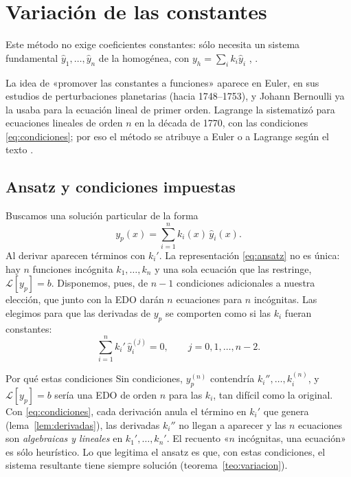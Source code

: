 \documentclass[11pt,twoside]{article}
\newcommand\Lop{\mathcal L}
\newcommand\yh{\hat y}
\begin{document}
\section{Variación de las constantes}\label{sec:variacion}

Este método no exige coeficientes constantes: sólo necesita un sistema fundamental $\yh_1,\dots,\yh_n$ de la homogénea, con
$y_h=\sum_ik_i\yh_i$ \cite[cap.~15]{riley}, \cite[cap.~IV]{usal}.

\begin{observacion}\label{obs:historia}
La idea de «promover las constantes a funciones» aparece en Euler, en sus estudios de perturbaciones planetarias (hacia
1748--1753), y Johann Bernoulli ya la usaba para la ecuación lineal de primer orden. Lagrange la sistematizó para
ecuaciones lineales de orden $n$ en la década de 1770, con las condiciones \eqref{eq:condiciones}; por eso el método se
atribuye a Euler o a Lagrange según el texto \cite{kline}.
\end{observacion}

\subsection{Ansatz y condiciones impuestas}\label{sec:ansatz}

Buscamos una solución particular de la forma
\begin{equation}\label{eq:ansatz}
y_p(x)=\sum_{i=1}^{n}k_i(x)\,\yh_i(x).
\end{equation}
Al derivar aparecen términos con $k_i'$. La representación \eqref{eq:ansatz} no es única: hay $n$ funciones incógnita
$k_1,\dots,k_n$ y una sola ecuación que las restringe, $\Lop[y_p]=b$. Disponemos, pues, de $n-1$ condiciones adicionales a
nuestra elección, que junto con la EDO darán $n$ ecuaciones para $n$ incógnitas. Las elegimos para que las derivadas de
$y_p$ se comporten como si las $k_i$ fueran constantes:
\begin{equation}\label{eq:condiciones}
\sum_{i=1}^{n}k_i'\,\yh_i^{(j)}=0,\qquad j=0,1,\dots,n-2.
\end{equation}

\begin{motivacion}{Por qué estas condiciones}
Sin condiciones, $y_p^{(n)}$ contendría $k_i'',\dots,k_i^{(n)}$, y $\Lop[y_p]=b$ sería una EDO de orden $n$ para las $k_i$,
tan difícil como la original. Con \eqref{eq:condiciones}, cada derivación anula el término en $k_i'$ que genera
(lema~\ref{lem:derivadas}), las derivadas $k_i''$ no llegan a aparecer y las $n$ ecuaciones son \emph{algebraicas y
lineales} en $k_1',\dots,k_n'$. El recuento «$n$ incógnitas, una ecuación» es sólo heurístico. Lo que legitima el ansatz es
que, con estas condiciones, el sistema resultante tiene siempre solución (teorema~\ref{teo:variacion}).
\end{motivacion}
\end{document}
